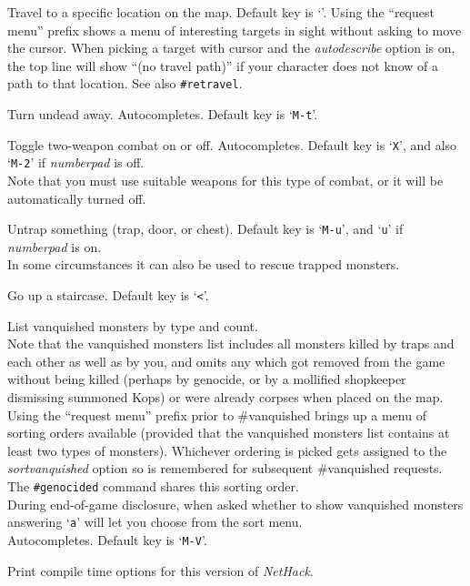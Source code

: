 \documentclass[titlepage]{article}
\begin{document}
\begin{description}[font=\mdseries\ttfamily]
\item[\#travel]
Travel to a specific location on the map.
Default key is `\texttt{\textunderscore }'.
Using the ``request menu'' prefix shows a menu of interesting targets in sight
without asking to move the cursor.
When picking a target with cursor and the \textit{autodescribe}
option is on, the top line will show ``(no travel path)'' if
your character does not know of a path to that location.
See also \texttt{\#retravel}.
\item[\#turn]
Turn undead away. Autocompletes. Default key is `\texttt{M-t}'.
\item[\#twoweapon]
Toggle two-weapon combat on or off. Autocompletes.
Default key is `\texttt{X}',
and also `\texttt{M-2}' if \textit{number\textunderscore pad} is off.\\
Note that you must
use suitable weapons for this type of combat, or it will
be automatically turned off.
\item[\#untrap]
Untrap something (trap, door, or chest).
Default key is `\texttt{M-u}', and `\texttt{u}' if \textit{number\textunderscore pad} is on.\\
In some circumstances it can also be used to rescue trapped monsters.
\item[\#up]
Go up a staircase. Default key is `\texttt{<}'.
\item[\#vanquished]
List vanquished monsters by type and count.
\\
Note that the vanquished monsters list includes all monsters killed by
traps and each other as well as by you, and omits any which got removed
from the game without being killed (perhaps by genocide, or by a mollified
shopkeeper dismissing summoned Kops) or were already corpses when placed
on the map.
\\
Using the ``request menu'' prefix prior to \#vanquished brings up
a menu of sorting orders available (provided that the vanquished monsters
list contains at least two types of monsters).
Whichever ordering is picked gets assigned to the \textit{sortvanquished}
option so is remembered for subsequent \#vanquished requests.
The \texttt{\#genocided} command shares this sorting order.
\\
During end-of-game disclosure, when asked whether to show vanquished
monsters answering `\texttt{a}' will let you choose from the sort menu.
\\
Autocompletes.
Default key is `\texttt{M-V}'.
\item[\#version]
Print compile time options for this version of \textit{NetHack}.


\end{description}
\end{document}
